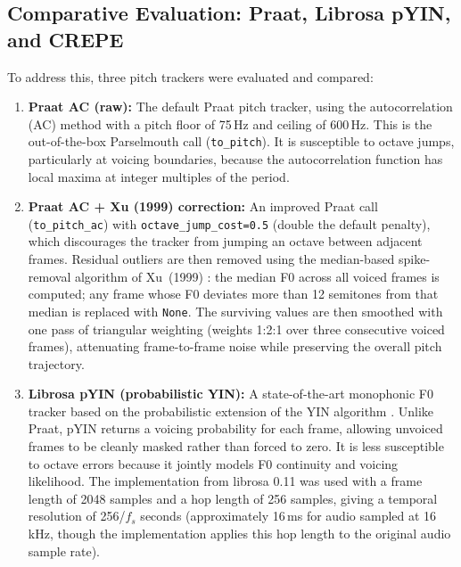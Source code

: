 \subsection{Comparative Evaluation: Praat, Librosa pYIN, and CREPE}
\label{sec:tracker_comparison}

To address this, three pitch trackers were evaluated and compared:

\begin{enumerate}

\item \textbf{Praat AC (raw):} The default Praat pitch tracker, using the
      autocorrelation (AC) method with a pitch floor of 75\,Hz and ceiling of
      600\,Hz. This is the out-of-the-box Parselmouth call (\texttt{to\_pitch}).
      It is susceptible to octave jumps, particularly at voicing boundaries,
      because the autocorrelation function has local maxima at integer multiples
      of the period.

\item \textbf{Praat AC + Xu (1999) correction:} An improved Praat call
      (\texttt{to\_pitch\_ac}) with \texttt{octave\_jump\_cost=0.5} (double the
      default penalty), which discourages the tracker from jumping an octave
      between adjacent frames. Residual outliers are then removed using the
      median-based spike-removal algorithm of Xu~(1999) \cite{xu1999}: the median
      F0 across all voiced frames is computed; any frame whose F0 deviates more
      than 12 semitones from that median is replaced with \texttt{None}. The
      surviving values are then smoothed with one pass of triangular weighting
      (weights 1:2:1 over three consecutive voiced frames), attenuating
      frame-to-frame noise while preserving the overall pitch trajectory.

\item \textbf{Librosa pYIN (probabilistic YIN):} A state-of-the-art monophonic
      F0 tracker based on the probabilistic extension of the YIN algorithm
      \cite{mauch2014pyin}. Unlike Praat, pYIN returns a voicing probability for
      each frame, allowing unvoiced frames to be cleanly masked rather than
      forced to zero. It is less susceptible to octave errors because it jointly
      models F0 continuity and voicing likelihood. The implementation from
      librosa 0.11 \cite{mcfee2015librosa} was used with a frame length of 2048
      samples and a hop length of 256 samples, giving a temporal resolution of
      256/$f_s$ seconds (approximately 16\,ms for audio sampled at 16\,kHz, though the
      implementation applies this hop length to the original audio sample rate).


\end{enumerate}
